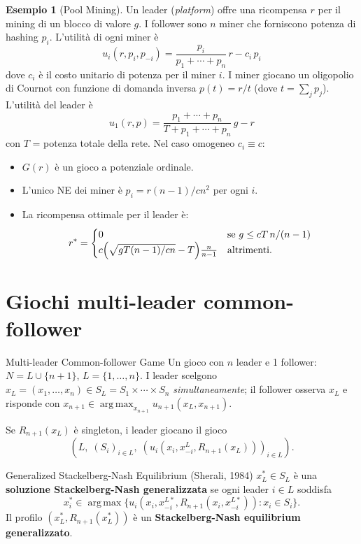 \documentclass[12pt,a4paper,twoside]{book}
\theoremstyle{plain}
\theoremstyle{definition}
\newtheorem{example}[theorem]{Esempio}
\newcommand{\argmax}{\operatorname*{arg\,max}}
\begin{document}
\begin{example}[Pool Mining]
Un leader (\textit{platform}) offre una ricompensa $r$ per il mining di un blocco di valore $g$. I follower sono $n$ miner che forniscono potenza di hashing $p_i$. L'utilità di ogni miner è
\[
  u_i(r,p_i,p_{-i}) = \frac{p_i}{p_1+\cdots+p_n}\,r - c_i\,p_i
\]
dove $c_i$ è il costo unitario di potenza per il miner $i$. I miner giocano un oligopolio di Cournot con funzione di domanda inversa $p(t)=r/t$ (dove $t=\sum_j p_j$). L'utilità del leader è
\[
  u_1(r,p) = \frac{p_1+\cdots+p_n}{T+p_1+\cdots+p_n}\,g - r
\]
con $T$ = potenza totale della rete. Nel caso omogeneo $c_i\equiv c$:
\begin{itemize}
  \item $G(r)$ è un gioco a potenziale ordinale.
  \item L'unico NE dei miner è $p_i=r(n-1)/cn^2$ per ogni $i$.
  \item La ricompensa ottimale per il leader è:
    \[
      r^* = \begin{cases}
        0 & \text{se }g\le cT\,n/(n-1)\\
        c\Bigl(\sqrt{gT(n-1)/cn} - T\Bigr)\frac{n}{n-1} & \text{altrimenti.}
      \end{cases}
    \]
\end{itemize}
\end{example}

\section{Giochi multi-leader common-follower}

\begin{defbox}{Multi-leader Common-follower Game}
Un gioco con $n$ leader e 1 follower: $N=L\cup\{n+1\}$, $L=\{1,\dots,n\}$. I leader scelgono $x_L=(x_1,\dots,x_n)\in S_L=S_1\times\cdots\times S_n$ \emph{simultaneamente}; il follower osserva $x_L$ e risponde con $x_{n+1}\in\argmax_{x_{n+1}}u_{n+1}(x_L,x_{n+1})$.

Se $R_{n+1}(x_L)$ è singleton, i leader giocano il gioco
\[
  (L,\;(S_i)_{i\in L},\;(u_i(x_i,x_{-i}^L,R_{n+1}(x_L)))_{i\in L}).
\]
\end{defbox}

\begin{defbox}{Generalized Stackelberg-Nash Equilibrium (Sherali, 1984)}
$x_L^*\in S_L$ è una \textbf{soluzione Stackelberg-Nash generalizzata} se ogni leader $i\in L$ soddisfa
\[
  x_i^*\in\argmax\{u_i(x_i,x_{-i}^{L*},R_{n+1}(x_i,x_{-i}^{L*})) : x_i\in S_i\}.
\]
Il profilo $(x_L^*,R_{n+1}(x_L^*))$ è un \textbf{Stackelberg-Nash equilibrium generalizzato}.
\end{defbox}
\end{document}
